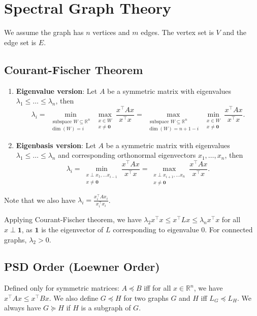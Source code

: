 \section{Spectral Graph Theory}

We assume the graph has $n$ vertices and $m$ edges. The vertex set is $V$ and the edge set is $E$.

\subsection{Courant-Fischer Theorem}
\begin{enumerate}
    \item \textbf{Eigenvalue version}: Let $A$ be a symmetric matrix with eigenvalues $\lambda_1 \le \dots \le \lambda_n$, then 
    $$\lambda_{i}=\min _{\substack{\text { subspace } W \subseteq \mathbb{R}^{n} \\ \operatorname{dim}(W)=i}} \max _{\substack{x \in W \\ x \neq \mathbf{0}}} \frac{x^{\top} A x}{x^{\top} x} = \max _{\substack{\text { subspace } W \subseteq \mathbb{R}^{n} \\ \operatorname{dim}(W)=n+1-i}} \min _{\substack{x \in W\\ x \neq \mathbf{0}}} \frac{x^{\top} A x}{x^{\top} x}.$$
    \item \textbf{Eigenbasis version}: Let $A$ be a symmetric matrix with eigenvalues $\lambda_1 \le \dots \le \lambda_n$ and corresponding orthonormal eigenvectors $x_1, \dots, x_n$, then
    $$\lambda_{i}=\min _{\substack{x \perp x_{1}, \ldots x_{i-1} \\ x \neq \mathbf{0}}} \frac{x^{\top} A x}{x^{\top} x} = \max _{\substack{x \perp x_{i+1}, \ldots x_{n} \\ x \neq \mathbf{0}}} \frac{x^{\top} A x}{x^{\top} x}.$$
\end{enumerate}
Note that we also have $\lambda_i = \frac{x_i^\top A x_i}{x_i^\top x_i}$.

Applying Courant-Fischer theorem, we have $\lambda_2 x^\top x  \le x^\top L x \le \lambda_n x^\top x$ for all $x \perp \boldsymbol{1}$, as $\boldsymbol{1}$ is the eigenvector of $L$ corresponding to eigenvalue $0$. For connected graphs, $\lambda_2 > 0$.

\subsection{PSD Order (Loewner Order)}

Defined only for symmetric matrices: $A \preceq B$ iff for all $x \in \mathbb{R}^{n}$, we have $x^{\top} A x \leq x^{\top} B x$. We also define $G \preceq H$ for two graphs $G$ and $H$ iff $L_G \preceq L_H$. We always have $G \succeq H$ if $H$ is a subgraph of $G$.

